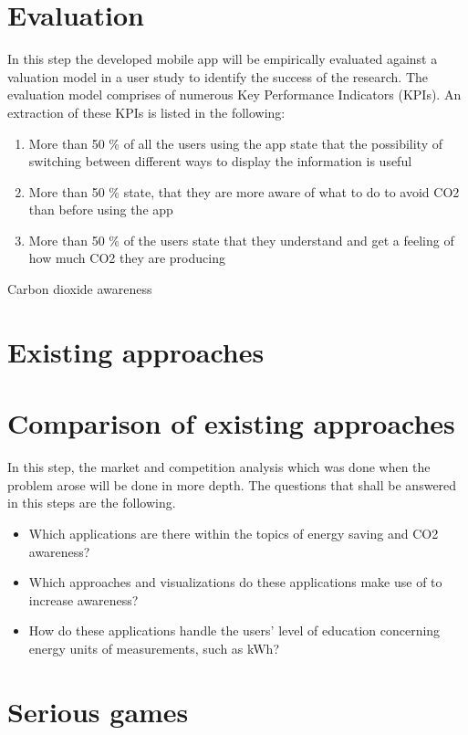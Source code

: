 \section{Evaluation}
In this step the developed mobile app will be empirically evaluated against a valuation model in a user study to identify the success of the research. The evaluation model comprises of numerous Key Performance Indicators (KPIs). An extraction of these KPIs is listed in the following:
\begin{enumerate}
	\item More than 50 \% of all the users using the app state that the possibility of switching between different ways to display the information is useful
	\item More than 50 \% state, that they are more aware of what to do to avoid CO2 than before using the app
	\item More than 50 \% of the users state that they understand and get a feeling of how much CO2 they are producing
\end{enumerate}


Carbon dioxide awareness

\cite{mohammadmoradieffectiveness}

\section{Existing approaches}

\section{Comparison of existing approaches}
In this step, the market and competition analysis which was done when the problem arose will be done in more depth. The questions that shall be answered in this steps are the following.
\begin{itemize}
	\item Which applications are there within the topics of energy saving and CO2 awareness?
	\item Which approaches and visualizations do these applications make use of to increase awareness?
	\item How do these applications handle the users' level of education concerning energy units of measurements, such as kWh?
\end{itemize}

\section{Serious games}

